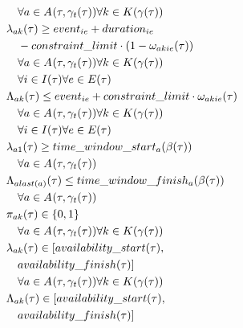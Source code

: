 \begin{alignat}{2}
	& \quad \forall a \in \SetActivity{\VarSupervisorAssignment{}{t}}{} \forall k \in \SetWorkSegment \notag                                                                        \\
	& \VarStartOfSegment{a}{k} \geq \ParEvent + \ParEventDuration \notag\\
	& \quad - \ParConstraintLimit \cdot (1 - \VarSegmentInRelation)                                             \notag\\ 
	& \quad \forall a \in \SetActivity{\VarSupervisorAssignment{}{t}}{} \forall k \in \SetWorkSegment \notag\\
	& \quad \forall i \in \SetTimeInstance \forall e \in \SetEvent                                \\
	& \VarFinishOfSegment{a}{k} \leq \ParEvent + \ParConstraintLimit \cdot \VarSegmentInRelation                                                                      \notag\\ 
	& \quad \forall a \in \SetActivity{\VarSupervisorAssignment{}{t}}{} \forall k \in \SetWorkSegment \notag\\
	& \quad \forall i \in \SetTimeInstance \forall e \in \SetEvent                                \\
	& \VarStartOfSegment{a}{1} \geq \ParTimeWindowStart \notag\\
	& \quad \forall a \in \SetActivity{\VarSupervisorAssignment{}{t}}{}                                                          \\
	& \VarFinishOfSegment{a}{last(a)} \leq \ParTimeWindowFinish \notag\\
	& \quad \forall a \in \SetActivity{\VarSupervisorAssignment{}{t}}{}                                                  \\
	& \VarActiveSegment{a}{k} \in \{0, 1\} \notag\\
	& \quad \forall a \in \SetActivity{\VarSupervisorAssignment{}{t}}{} \forall k \in \SetWorkSegment                                          \\
	& \VarStartOfSegment{a}{k} \in [\ParAvailabilityStart, \notag\\
	& \quad \ParAvailabilityFinish] \notag\\
	& \quad \forall a \in \SetActivity{\VarSupervisorAssignment{}{t}}{} \forall k \in \SetWorkSegment  \\
	& \VarFinishOfSegment{a}{k} \in [\ParAvailabilityStart, \notag\\
	& \quad \ParAvailabilityFinish] \notag\\

\end{alignat}
